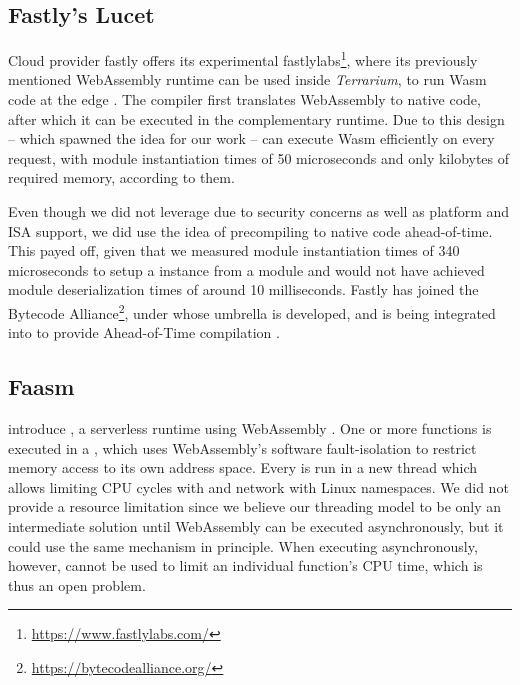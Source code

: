 
\subsection{Fastly's Lucet}

Cloud provider fastly offers its experimental fastlylabs\footnote{\url{https://www.fastlylabs.com/}}, where its previously mentioned  WebAssembly runtime can be used inside \emph{Terrarium}, to run Wasm code at the edge \cite{fastly2019}. The  compiler first translates WebAssembly to native code, after which it can be executed in the complementary runtime. Due to this design -- which spawned the idea for our work --  can execute Wasm efficiently on every request, with module instantiation times of 50 microseconds and only kilobytes of required memory, according to them.

Even though we did not leverage  due to security concerns as well as platform and ISA support, we did use the idea of precompiling to native code ahead-of-time. This payed off, given that we measured module instantiation times of 340 microseconds to setup a  instance from a module and would not have achieved module deserialization times of around 10 milliseconds.
Fastly has joined the Bytecode Alliance\footnote{\url{https://bytecodealliance.org/}}, under whose umbrella  is developed, and  is being integrated into  to provide Ahead-of-Time compilation \cite{Hickey2020}.

\subsection{Faasm}

\citeauthor{Shillaker2020} introduce , a serverless runtime using WebAssembly \cite{Shillaker2020}. One or more functions is executed in a , which uses WebAssembly's software fault-isolation to restrict memory access to its own address space. Every  is run in a new thread which allows limiting CPU cycles with  and network with Linux namespaces.
We did not provide a resource limitation since we believe our threading model to be only an intermediate solution until WebAssembly can be executed asynchronously, but it could use the same  mechanism in principle. When executing asynchronously, however,  cannot be used to limit an individual function's CPU time, which is thus an open problem.

